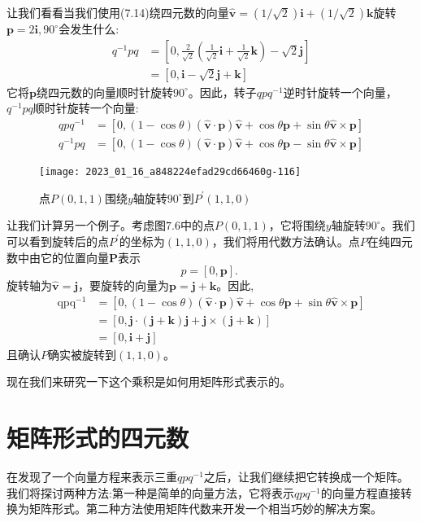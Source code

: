 让我们看看当我们使用(7.14)绕四元数的向量$\hat{\mathbf{v}}=(1 / \sqrt{2}) \mathbf{i}+(1 / \sqrt{2}) \mathbf{k}$旋转$\mathbf{p}=2 \mathbf{i}, 90^{\circ}$会发生什么:
$$
\begin{aligned}
q^{-1} p q & =\left[0, \frac{2}{\sqrt{2}}\left(\frac{1}{\sqrt{2}} \mathbf{i}+\frac{1}{\sqrt{2}} \mathbf{k}\right)-\sqrt{2} \mathbf{j}\right] \\
& =[0, \mathbf{i}-\sqrt{2} \mathbf{j}+\mathbf{k}]
\end{aligned}
$$
它将$\mathbf{p}$绕四元数的向量顺时针旋转$90^{\circ}$。因此，转子$q p q^{-1}$逆时针旋转一个向量，$q^{-1} p q$顺时针旋转一个向量:
$$
\begin{aligned}
q p q^{-1} & =[0,(1-\cos \theta)(\hat{\mathbf{v}} \cdot \mathbf{p}) \hat{\mathbf{v}}+\cos \theta \mathbf{p}+\sin \theta \hat{\mathbf{v}} \times \mathbf{p}] \\
q^{-1} p q & =[0,(1-\cos \theta)(\hat{\mathbf{v}} \cdot \mathbf{p}) \hat{\mathbf{v}}+\cos \theta \mathbf{p}-\sin \theta \hat{\mathbf{v}} \times \mathbf{p}]
\end{aligned}
$$

\begin{figure}[h!]
    \centering
    \texttt{[image: 2023\_01\_16\_a848224efad29cd66460g-116]}
    \caption[short]{点$P(0,1,1)$围绕$y$轴旋转$90^{\circ}$到$P^{\prime}(1,1,0)$}
\end{figure}

让我们计算另一个例子。考虑图$7.6$中的点$P(0,1,1)$，它将围绕$y$轴旋转$90^{\circ}$。我们可以看到旋转后的点$P^{\prime}$的坐标为$(1,1,0)$，我们将用代数方法确认。点$P$在纯四元数中由它的位置向量$\mathbf{P}$表示
$$
p=[0, \mathbf{p}] \text {. }
$$
旋转轴为$\hat{\mathbf{v}}=\mathbf{j}$，要旋转的向量为$\mathbf{p}=\mathbf{j}+\mathbf{k}$。因此,
$$
\begin{aligned}
\operatorname{qpq}^{-1} & =[0,(1-\cos \theta)(\hat{\mathbf{v}} \cdot \mathbf{p}) \hat{\mathbf{v}}+\cos \theta \mathbf{p}+\sin \theta \hat{\mathbf{v}} \times \mathbf{p}] \\
& =[0, \mathbf{j} \cdot(\mathbf{j}+\mathbf{k}) \mathbf{j}+\mathbf{j} \times(\mathbf{j}+\mathbf{k})] \\
& =[0, \mathbf{i}+\mathbf{j}]
\end{aligned}
$$
且确认$P$确实被旋转到$(1,1,0)$。

现在我们来研究一下这个乘积是如何用矩阵形式表示的。

\section{矩阵形式的四元数}
在发现了一个向量方程来表示三重$q p q^{-1}$之后，让我们继续把它转换成一个矩阵。我们将探讨两种方法:第一种是简单的向量方法，它将表示$q p q^{-1}$的向量方程直接转换为矩阵形式。第二种方法使用矩阵代数来开发一个相当巧妙的解决方案。

